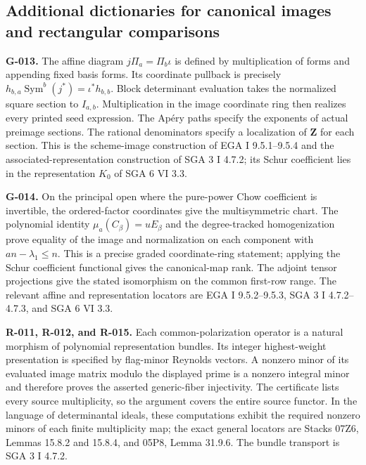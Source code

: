\documentclass[
  10pt,
]{article}
\begin{document}
\subsection{Additional dictionaries for canonical images and rectangular
comparisons}\label{additional-dictionaries-for-canonical-images-and-rectangular-comparisons}

\textbf{G-013.} The affine diagram \(j\Pi_a=\Pi_b\iota\) is defined by
multiplication of forms and appending fixed basis forms. Its coordinate
pullback is precisely
\(h_{b,a}\operatorname{Sym}^b(j^*)=\iota^*h_{b,b}\). Block determinant
evaluation takes the normalized square section to \(I_{a,b}\).
Multiplication in the image coordinate ring then realizes every printed
seed expression. The Apéry paths specify the exponents of actual
preimage sections. The rational denominators specify a localization of
\(\mathbf Z\) for each section. This is the scheme-image construction of
EGA I 9.5.1--9.5.4 and the associated-representation construction of SGA
3 I 4.7.2; its Schur coefficient lies in the representation \(K_0\) of
SGA 6 VI 3.3.

\textbf{G-014.} On the principal open where the pure-power Chow
coefficient is invertible, the ordered-factor coordinates give the
multisymmetric chart. The polynomial identity
\(\mu_a(C_\beta)=uE_\beta\) and the degree-tracked homogenization prove
equality of the image and normalization on each component with
\(an-\lambda_1\le n\). This is a precise graded coordinate-ring
statement; applying the Schur coefficient functional gives the
canonical-map rank. The adjoint tensor projections give the stated
isomorphism on the common first-row range. The relevant affine and
representation locators are EGA I 9.5.2--9.5.3, SGA 3 I 4.7.2--4.7.3,
and SGA 6 VI 3.3.

\textbf{R-011, R-012, and R-015.} Each common-polarization operator is a
natural morphism of polynomial representation bundles. Its integer
highest-weight presentation is specified by flag-minor Reynolds vectors.
A nonzero minor of its evaluated image matrix modulo the displayed prime
is a nonzero integral minor and therefore proves the asserted
generic-fiber injectivity. The certificate lists every source
multiplicity, so the argument covers the entire source functor. In the
language of determinantal ideals, these computations exhibit the
required nonzero minors of each finite multiplicity map; the exact
general locators are Stacks 07Z6, Lemmas 15.8.2 and 15.8.4, and 05P8,
Lemma 31.9.6. The bundle transport is SGA 3 I 4.7.2.
\end{document}

